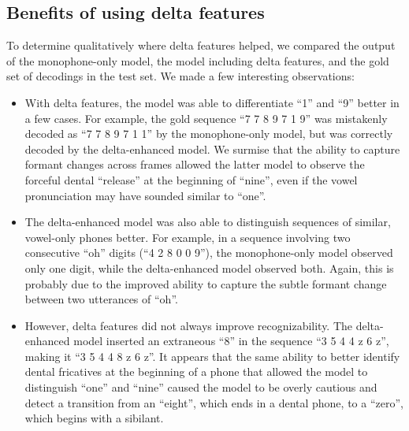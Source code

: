 \documentclass[11pt]{article}
\begin{document}
\subsection{Benefits of using delta features}
To determine qualitatively where delta features helped, we compared the output
of the monophone-only model, the model including delta features, and the gold
set of decodings in the test set. We made a few interesting observations:

\begin{itemize}
  \item With delta features, the model was able to differentiate ``1'' and ``9''
  better in a few cases. For example, the gold sequence ``7 7 8 9 7 1 9'' was
  mistakenly decoded as ``7 7 8 9 7 1 1'' by the monophone-only model, but was
  correctly decoded by the delta-enhanced model. We surmise that the ability to
  capture formant changes across frames allowed the latter model to observe the
  forceful dental ``release'' at the beginning of ``nine'', even if the vowel
  pronunciation may have sounded similar to ``one''.
  \item The delta-enhanced model was also able to distinguish sequences of
  similar, vowel-only phones better. For example, in a sequence involving two
  consecutive ``oh'' digits (``4 2 8 0 0 9''), the monophone-only model observed
  only one digit, while the delta-enhanced model observed both. Again, this is
  probably due to the improved ability to capture the subtle formant change
  between two utterances of ``oh''.
  \item However, delta features did not always improve recognizability. The
  delta-enhanced model inserted an extraneous ``8'' in the sequence ``3 5 4 4 z
  6 z'', making it ``3 5 4 4 8 z 6 z''. It appears that the same ability to
  better identify dental fricatives at the beginning of a phone that allowed the
  model to distinguish ``one'' and ``nine'' caused the model to be overly
  cautious and detect a transition from an ``eight'', which ends in a dental
  phone, to a ``zero'', which begins with a sibilant.
\end{itemize}
\end{document}
